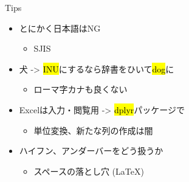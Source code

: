 \documentclass[ignorenonframetext,]{beamer}
\begin{document}
\begin{frame}{\faMagic Tips}

\begin{itemize}
\itemsep1pt\parskip0pt
\item
  とにかく日本語はNG

  \begin{itemize}
  \itemsep1pt\parskip0pt
  \item
    SJIS
  \end{itemize}
\item
  犬 -\textgreater{} \hl{INU}にするなら辞書をひいて\hl{dog}に

  \begin{itemize}
  \itemsep1pt\parskip0pt
  \item
    ローマ字カナも良くない
  \end{itemize}
\item
  Excelは入力・閲覧用 -\textgreater{} \hl{dplyr}パッケージで

  \begin{itemize}
  \itemsep1pt\parskip0pt
  \item
    単位変換、新たな列の作成は闇
  \end{itemize}
\item
  ハイフン、アンダーバーをどう扱うか

  \begin{itemize}
  \itemsep1pt\parskip0pt
  \item
    スペースの落とし穴 (\LaTeX)
  \end{itemize}
\end{itemize}

\end{frame}

\begin{frame}


\end{frame}

\begin{frame}


\end{frame}
\end{document}
